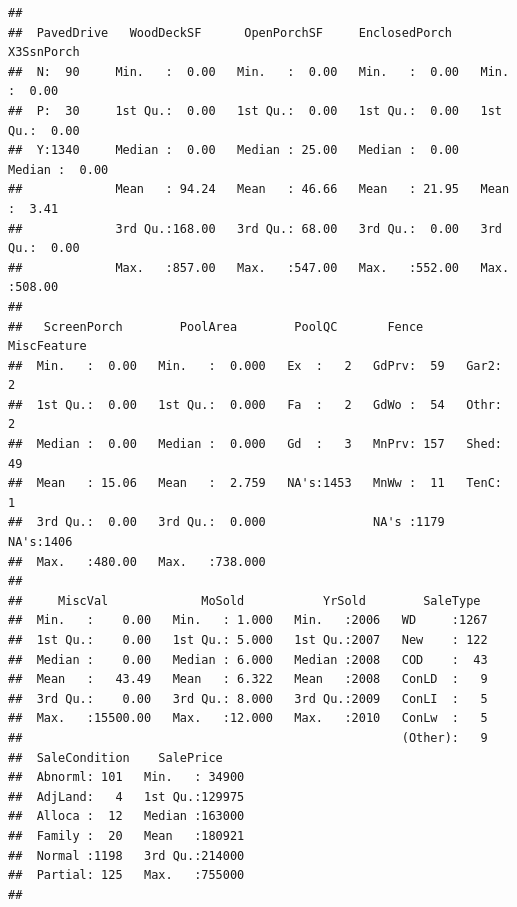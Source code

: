 \documentclass[
]{article}
\begin{document}
\begin{verbatim}
##                                                                       
##  PavedDrive   WoodDeckSF      OpenPorchSF     EnclosedPorch      X3SsnPorch    
##  N:  90     Min.   :  0.00   Min.   :  0.00   Min.   :  0.00   Min.   :  0.00  
##  P:  30     1st Qu.:  0.00   1st Qu.:  0.00   1st Qu.:  0.00   1st Qu.:  0.00  
##  Y:1340     Median :  0.00   Median : 25.00   Median :  0.00   Median :  0.00  
##             Mean   : 94.24   Mean   : 46.66   Mean   : 21.95   Mean   :  3.41  
##             3rd Qu.:168.00   3rd Qu.: 68.00   3rd Qu.:  0.00   3rd Qu.:  0.00  
##             Max.   :857.00   Max.   :547.00   Max.   :552.00   Max.   :508.00  
##                                                                                
##   ScreenPorch        PoolArea        PoolQC       Fence      MiscFeature
##  Min.   :  0.00   Min.   :  0.000   Ex  :   2   GdPrv:  59   Gar2:   2  
##  1st Qu.:  0.00   1st Qu.:  0.000   Fa  :   2   GdWo :  54   Othr:   2  
##  Median :  0.00   Median :  0.000   Gd  :   3   MnPrv: 157   Shed:  49  
##  Mean   : 15.06   Mean   :  2.759   NA's:1453   MnWw :  11   TenC:   1  
##  3rd Qu.:  0.00   3rd Qu.:  0.000               NA's :1179   NA's:1406  
##  Max.   :480.00   Max.   :738.000                                       
##                                                                         
##     MiscVal             MoSold           YrSold        SaleType   
##  Min.   :    0.00   Min.   : 1.000   Min.   :2006   WD     :1267  
##  1st Qu.:    0.00   1st Qu.: 5.000   1st Qu.:2007   New    : 122  
##  Median :    0.00   Median : 6.000   Median :2008   COD    :  43  
##  Mean   :   43.49   Mean   : 6.322   Mean   :2008   ConLD  :   9  
##  3rd Qu.:    0.00   3rd Qu.: 8.000   3rd Qu.:2009   ConLI  :   5  
##  Max.   :15500.00   Max.   :12.000   Max.   :2010   ConLw  :   5  
##                                                     (Other):   9  
##  SaleCondition    SalePrice     
##  Abnorml: 101   Min.   : 34900  
##  AdjLand:   4   1st Qu.:129975  
##  Alloca :  12   Median :163000  
##  Family :  20   Mean   :180921  
##  Normal :1198   3rd Qu.:214000  
##  Partial: 125   Max.   :755000  
## 
\end{verbatim}
\end{document}

